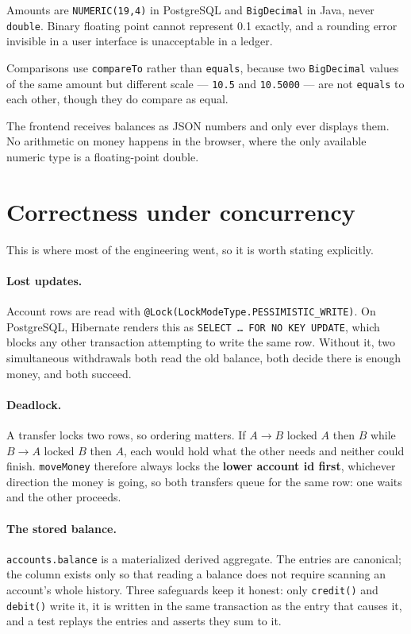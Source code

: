 \documentclass[11pt,a4paper]{article}
\begin{document}
Amounts are \texttt{NUMERIC(19,4)} in PostgreSQL and \texttt{BigDecimal} in Java, never
\texttt{double}. Binary floating point cannot represent 0.1 exactly, and a rounding error invisible
in a user interface is unacceptable in a ledger.

Comparisons use \texttt{compareTo} rather than \texttt{equals}, because two \texttt{BigDecimal}
values of the same amount but different scale --- \texttt{10.5} and \texttt{10.5000} --- are not
\texttt{equals} to each other, though they do compare as equal.

The frontend receives balances as JSON numbers and only ever displays them. No arithmetic on money
happens in the browser, where the only available numeric type is a floating-point double.

\section{Correctness under concurrency}

This is where most of the engineering went, so it is worth stating explicitly.

\paragraph{Lost updates.} Account rows are read with
\texttt{@Lock(LockModeType.PESSIMISTIC\_WRITE)}. On PostgreSQL, Hibernate renders this as
\texttt{SELECT \ldots\ FOR NO KEY UPDATE}, which blocks any other transaction attempting to write
the same row. Without it, two simultaneous withdrawals both read the old balance, both decide there
is enough money, and both succeed.

\paragraph{Deadlock.} A transfer locks two rows, so ordering matters. If $A \rightarrow B$ locked
$A$ then $B$ while $B \rightarrow A$ locked $B$ then $A$, each would hold what the other needs and
neither could finish. \texttt{moveMoney} therefore always locks the \textbf{lower account id
first}, whichever direction the money is going, so both transfers queue for the same row: one waits
and the other proceeds.

\paragraph{The stored balance.} \texttt{accounts.balance} is a materialized derived aggregate. The
entries are canonical; the column exists only so that reading a balance does not require scanning
an account's whole history. Three safeguards keep it honest: only \texttt{credit()} and
\texttt{debit()} write it, it is written in the same transaction as the entry that causes it, and a
test replays the entries and asserts they sum to it.
\end{document}
